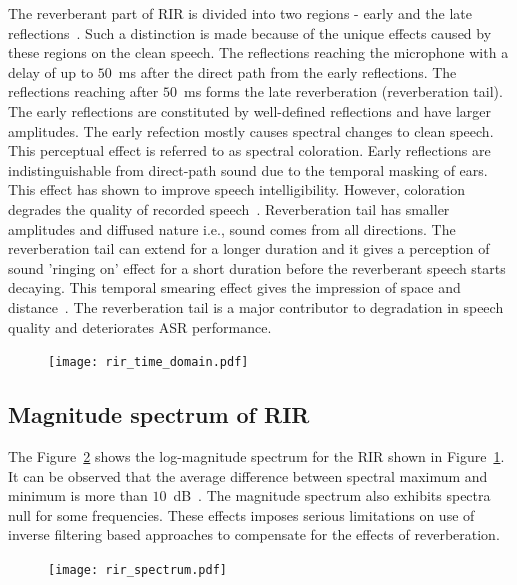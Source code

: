 The reverberant part of RIR is divided into two regions - early and the late reflections~\cite{naylor2010speech}. Such a distinction is made because of the unique effects caused by these regions on the clean speech. The reflections reaching the microphone with a delay of up to $50$~ms after the direct path from the early reflections. The reflections reaching after $50$~ms forms the late reverberation (reverberation tail). The early reflections are constituted by well-defined reflections and have larger amplitudes. 
The early refection mostly causes spectral changes to clean speech. This perceptual effect is referred to as spectral coloration. Early reflections are indistinguishable from direct-path sound due to the temporal masking of ears. This effect has shown to improve speech intelligibility. However, coloration degrades the quality of recorded speech~\cite{naylor2010speech,kuttruff2016room}. Reverberation tail has smaller amplitudes and diffused nature i.e., sound comes from all directions. The reverberation tail can extend for a longer duration and it gives a perception of sound 'ringing on' effect for a short duration before the reverberant speech starts decaying. This temporal smearing effect gives the impression of space and distance~\cite{naylor2010speech}. The reverberation tail is a major contributor to degradation in speech quality and deteriorates ASR performance.   
\begin{figure}[ht!]
\centering
\texttt{[image: rir\_time\_domain.pdf]}
\label{fig:rir_time_domain}
\end{figure}

\subsection{Magnitude spectrum of RIR}
The Figure~\ref{fig:rir_spectrum} shows the log-magnitude spectrum for the RIR shown in Figure~\ref{fig:rir_time_domain}. It can be observed that the average difference between spectral maximum and minimum is more than $10$~dB~\cite{kuttruff2016room}. The magnitude spectrum also exhibits spectra null for some frequencies. These effects imposes serious limitations on use of inverse filtering based approaches to compensate for the effects of reverberation.   
\begin{figure}[ht!]
\centering
\texttt{[image: rir\_spectrum.pdf]}
\label{fig:rir_spectrum}
\end{figure}

